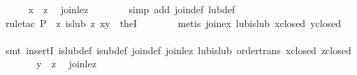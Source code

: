 \begin{isabellebody}
\ \ \ \ \isamarkupfalse%
\ {}x\ {}\ z{}\ \isamarkupfalse%
\ join{}le{}z\isanewline
\ \ \ \ \ \ \isamarkupfalse%
\ {}simp\ add{}\ join{}def\ lub{}def{}\isanewline
\ \ \ \ \ \ \isamarkupfalse%
\ {}rule{}tac\ {}P\ {}\ {}{}z{}\ is{}lub\ z\ {}x{}y{}{}\ \ the{}I{}{}\isanewline
\ \ \ \ \ \ \isamarkupfalse%
\ {}metis\ join{}ex\ lub{}is{}lub\ x{}closed\ y{}closed{}\isanewline
\ \ \ \ \ \ \isamarkupfalse%
\ {}smt\ insertI{}\ is{}lub{}def\ is{}ub{}def\ join{}def\ join{}le{}z\ lub{}is{}lub\ order{}trans\ x{}closed\ z{}closed{}\isanewline
\ \ \ \ \isamarkupfalse%
\ \isamarkupfalse%
\ {}y\ {}\ z{}\ \isamarkupfalse%
\ join{}le{}z\isanewline

\end{isabellebody}
